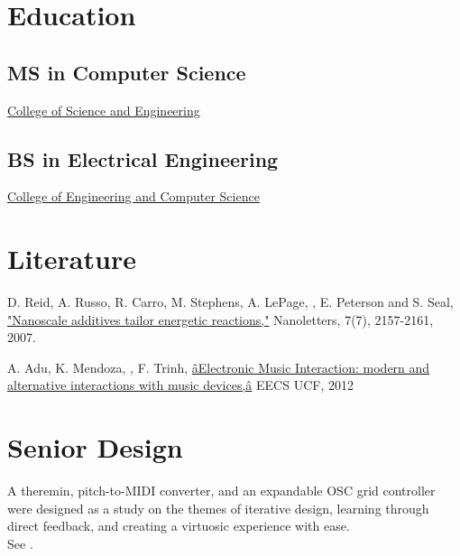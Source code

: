 \documentclass[]{deedy-resume-openfont} %
\begin{document}
\lastupdated
{}

\begin{minipage}[t]{0.34\textwidth}
\section{Education}
\subsection{MS in Computer Science}
\href{http://cs.sfsu.edu}{College of Science and Engineering}
\sectionsep

\subsection{BS in Electrical Engineering}
\href{http://www.ece.ucf.edu}{College of Engineering and Computer Science}

\section{Literature}
\textbullet{} D. Reid, A. Russo, R. Carro, M. Stephens, A. LePage, , E. Peterson and S. Seal, \href{http://pubs.acs.org/doi/abs/10.1021/nl0625372}{"Nanoscale additives tailor energetic reactions,"} Nanoletters, 7(7), 2157-2161, 2007.

\textbullet{} A. Adu, K. Mendoza, , F. Trinh, \href{http://eecs.ucf.edu/seniordesign/su2012fa2012/g01/docs/seniordesign2paper.pdf}{âElectronic Music Interaction: modern and alternative interactions with music  devices,â} EECS UCF, 2012

\section{Senior Design}
A theremin, pitch-to-MIDI converter, and an expandable OSC grid controller were designed as a study on the themes of iterative design, learning through direct feedback, and creating a virtuosic experience with ease. \\
See \href{http://eecs.ucf.edu/seniordesign/su2012fa2012/g01}{}.%


\end{minipage}
\end{document}
